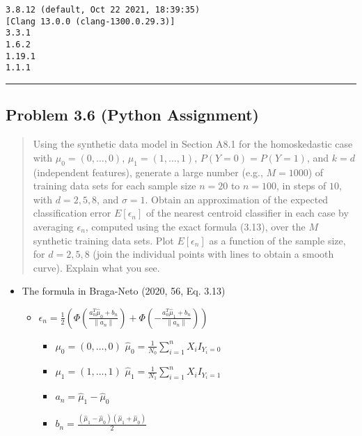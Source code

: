 \documentclass[
  letterpaper,
  DIV=11,
  numbers=noendperiod]{scrartcl}
\providecommand{\tightlist}{%
  \setlength{\itemsep}{0pt}\setlength{\parskip}{0pt}}\usepackage{longtable,booktabs,array}
\begin{document}
\begin{verbatim}
3.8.12 (default, Oct 22 2021, 18:39:35) 
[Clang 13.0.0 (clang-1300.0.29.3)]
3.3.1
1.6.2
1.19.1
1.1.1
\end{verbatim}

\begin{center}\rule{0.5\linewidth}{0.5pt}\end{center}

\hypertarget{problem-3.6-python-assignment}{%
\subsection{Problem 3.6 (Python
Assignment)}\label{problem-3.6-python-assignment}}

\begin{quote}
Using the synthetic data model in Section A8.1 for the homoskedastic
case with \(\mu_0 = (0,\dots,0)\), \(\mu_1=(1,\dots,1)\),
\(P(Y=0)=P(Y=1)\), and \(k=d\) (independent features), generate a large
number (e.g., \(M=1000\)) of training data sets for each sample size
\(n=20\) to \(n=100\), in steps of \(10\), with \(d=2,5,8\), and
\(\sigma=1\). Obtain an approximation of the expected classification
error \(E[\epsilon_n]\) of the nearest centroid classifier in each case
by averaging \(\epsilon_n\), computed using the exact formula (3.13),
over the \(M\) synthetic training data sets. Plot \(E[\epsilon_n]\) as a
function of the sample size, for \(d=2,5,8\) (join the individual points
with lines to obtain a smooth curve). Explain what you see.
\end{quote}

\begin{itemize}
\tightlist
\item
  The formula in Braga-Neto (2020, 56, Eq. 3.13)

  \begin{itemize}
  \tightlist
  \item
    \(\epsilon_n = \frac{1}{2}\left(\Phi\left(\frac{a_{n}^{T}\hat{\mu}_0 + b_n}{\|a_n\|}\right) + \Phi\left(-\frac{a_{n}^{T}\hat{\mu}_1 + b_n}{\|a_n\|}\right) \right)\)

    \begin{itemize}
    \tightlist
    \item
      \(\mu_0 = (0,\dots, 0)\)
      \(\hat{\mu}_0 = \frac{1}{N_0}\sum^{n}_{i=1}X_i I_{Y_i=0}\)
    \item
      \(\mu_1 = (1,\dots,1)\)
      \(\hat{\mu}_1 = \frac{1}{N_1}\sum^{n}_{i=1}X_i I_{Y_i=1}\)
    \item
      \(a_n = \hat{\mu}_1 - \hat{\mu}_0\)
    \item
      \(b_n = \frac{(\hat{\mu}_1 - \hat{\mu}_0)(\hat{\mu}_1 + \hat{\mu}_0)}{2}\)
    \end{itemize}
  \end{itemize}
\end{itemize}
\end{document}
